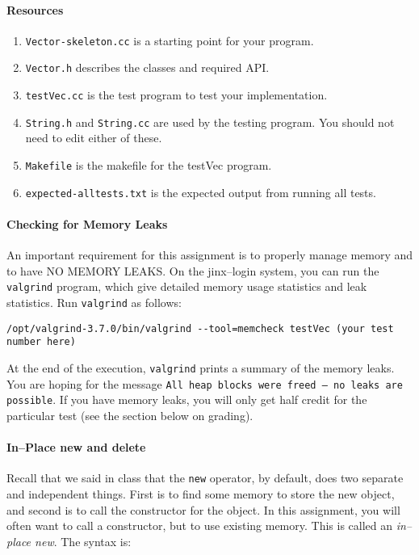 \documentclass[10pt]{article}
\begin{document}
\paragraph{Resources}
\begin{enumerate}
\item {\tt Vector-skeleton.cc} is a starting point for your program.
\item {\tt Vector.h} describes the classes and required API.
\item {\tt testVec.cc} is the test program to test your implementation.
\item {\tt String.h} and {\tt String.cc} are used by the testing program.
You should not need to edit either of these.
\item {\tt Makefile} is the makefile for the testVec program.
\item {\tt expected-alltests.txt} is the expected output from running
all tests.
\end{enumerate}

\paragraph{Checking for Memory Leaks}
An important requirement for this assignment is to properly manage memory
and to have NO MEMORY LEAKS.  On the jinx--login system, you can run
the {\tt valgrind} program, which give detailed memory usage statistics
and leak statistics.  Run {\tt valgrind} as follows:

\begin{verbatim}
/opt/valgrind-3.7.0/bin/valgrind --tool=memcheck testVec (your test number here)
\end{verbatim}

At the end of the execution, {\tt valgrind} prints a summary of the
memory leaks.  You are hoping for the message
{\tt All heap blocks were freed -- no leaks are possible}.
If you have memory leaks, you will only get half credit for the particular
test (see the section below on grading).

\paragraph{In--Place new and delete}
Recall that we said in class that the {\tt new} operator, by default,
does two separate and independent things. First is to find some memory
to store the new object, and second is to call the constructor for
the object.  In this assignment, you will often want to call a constructor,
but to use existing memory.  This is called an {\em in--place new}.
The syntax is:
\end{document}
